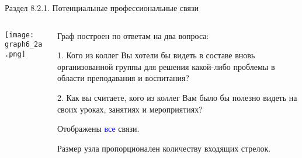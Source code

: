 \begin{frame}{Раздел 8.2.1. Потенциальные профессиональные связи}

\begin{columns}
\begin{column}{0.75\textwidth} 
\centering
          \texttt{[image: graph6\_2a.png]}
\end{column}
\begin{column}{0.25\textwidth} 

\tiny
Граф построен по ответам на два вопроса:
\smallskip

1. Кого из коллег Вы хотели бы видеть в составе вновь организованной группы для решения какой-либо проблемы в области преподавания и воспитания?
\smallskip

2. Как вы считаете, кого из коллег Вам было бы полезно видеть на своих уроках, занятиях и мероприятиях?
\smallskip

Отображены \textcolor{blue}{все} связи. 
\smallskip

Размер узла пропорционален количеству входящих стрелок.

\end{column}
\end{columns}
\end{frame}


